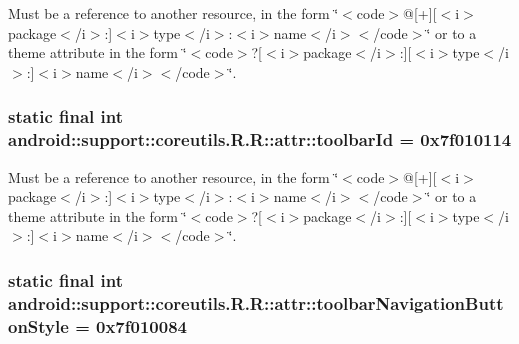 Must be a reference to another resource, in the form \char`\"{}$<$code$>$@\mbox{[}+\mbox{]}\mbox{[}$<$i$>$package$<$/i$>$:\mbox{]}$<$i$>$type$<$/i$>$:$<$i$>$name$<$/i$>$$<$/code$>$\char`\"{} or to a theme attribute in the form \char`\"{}$<$code$>$?\mbox{[}$<$i$>$package$<$/i$>$:\mbox{]}\mbox{[}$<$i$>$type$<$/i$>$:\mbox{]}$<$i$>$name$<$/i$>$$<$/code$>$\char`\"{}. \hypertarget{classandroid_1_1support_1_1coreutils_1_1_r_1_1attr_2c9ac81ec3573f1560c060fa63277f14}{
\subsubsection[{toolbarId}]{\setlength{\rightskip}{0pt plus 5cm}static final int android::support::coreutils.R.R::attr::toolbarId = 0x7f010114}}
\label{classandroid_1_1support_1_1coreutils_1_1_r_1_1attr_2c9ac81ec3573f1560c060fa63277f14}


Must be a reference to another resource, in the form \char`\"{}$<$code$>$@\mbox{[}+\mbox{]}\mbox{[}$<$i$>$package$<$/i$>$:\mbox{]}$<$i$>$type$<$/i$>$:$<$i$>$name$<$/i$>$$<$/code$>$\char`\"{} or to a theme attribute in the form \char`\"{}$<$code$>$?\mbox{[}$<$i$>$package$<$/i$>$:\mbox{]}\mbox{[}$<$i$>$type$<$/i$>$:\mbox{]}$<$i$>$name$<$/i$>$$<$/code$>$\char`\"{}. \hypertarget{classandroid_1_1support_1_1coreutils_1_1_r_1_1attr_0c0b57a985a4b0c56c6b84b9eec8f1fe}{
\subsubsection[{toolbarNavigationButtonStyle}]{\setlength{\rightskip}{0pt plus 5cm}static final int android::support::coreutils.R.R::attr::toolbarNavigationButtonStyle = 0x7f010084}}
\label{classandroid_1_1support_1_1coreutils_1_1_r_1_1attr_0c0b57a985a4b0c56c6b84b9eec8f1fe}


